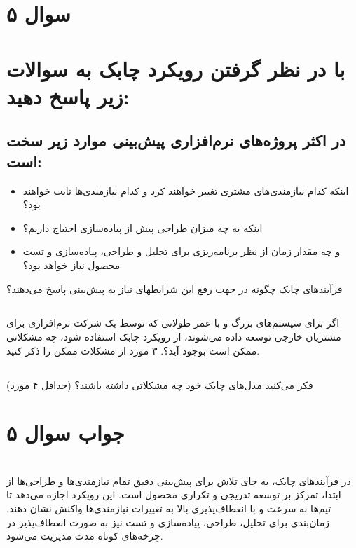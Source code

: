 \section*{سوال ۵}

\section*{با در نظر گرفتن رویکرد چابک به سوالات زیر پاسخ دهید:}
\subsection*{ در اکثر پروژه‌های نرم‌افزاری پیش‌بینی موارد زیر سخت است:}
\begin{itemize}
	\item اینکه کدام نیازمندی‌های مشتری تغییر خواهند کرد و کدام نیازمندی‌ها ثابت خواهند بود؟
	\item اینکه به چه میزان طراحی پیش از پیاده‌سازی احتیاج داریم؟
	\item و چه مقدار زمان از نظر برنامه‌ریزی برای تحلیل و طراحی، پیاده‌سازی و تست محصول نیاز خواهد بود؟
\end{itemize}
فرآیندهای چابک چگونه در جهت رفع این شرایطهای نیاز به پیش‌بینی پاسخ می‌دهند؟

\subsection*{}
 اگر برای سیستم‌های بزرگ و با عمر طولانی که توسط یک شرکت نرم‌افزاری برای مشتریان خارجی توسعه داده می‌شوند، از رویکرد چابک استفاده شود، چه مشکلاتی ممکن است بوجود آید؟. ۳ مورد از مشکلات ممکن را ذکر کنید.

\subsection*{}
 فکر می‌کنید مدل‌های چابک خود چه مشکلاتی داشته باشند؟ (حداقل ۴ مورد)

\section*{جواب سوال ۵}

\section*{}
در فرآیندهای چابک، به جای تلاش برای پیش‌بینی دقیق تمام نیازمندی‌ها و طراحی‌ها از ابتدا، تمرکز بر توسعه تدریجی و تکراری محصول است. این رویکرد اجازه می‌دهد تا تیم‌ها به سرعت و با انعطاف‌پذیری بالا به تغییرات نیازمندی‌ها واکنش نشان دهند. زمان‌بندی برای تحلیل، طراحی، پیاده‌سازی و تست نیز به صورت انعطاف‌پذیر در چرخه‌های کوتاه مدت مدیریت می‌شود.

